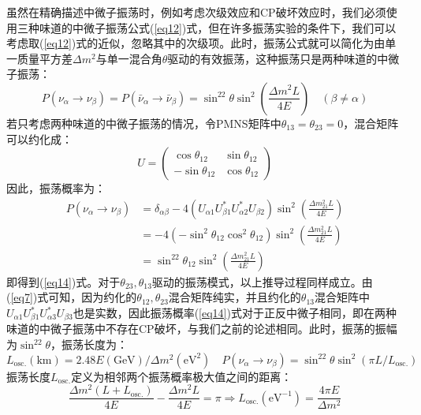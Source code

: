 \documentclass{article}
\begin{document}
		虽然在精确描述中微子振荡时，例如考虑次级效应和CP破坏效应时，我们必须使用三种味道的中微子振荡公式(\ref{eq12})式，但在许多振荡实验的条件下，我们可以考虑取(\ref{eq12})式的近似，忽略其中的次级项。此时，振荡公式就可以简化为由单一质量平方差$\Delta m^2$与单一混合角$\theta$驱动的有效振荡，这种振荡只是两种味道的中微子振荡：
		\begin{equation}
			P(\nu_\alpha\to\nu_\beta)=P(\bar{\nu}_\alpha\to\bar{\nu}_\beta)=\sin^22\theta\sin^2\left(\frac{\Delta m^2 L}{4E}\right)\quad (\beta\ne\alpha)
			\label{eq14}
		\end{equation}
		若只考虑两种味道的中微子振荡的情况，令PMNS矩阵中$\theta_{13}=\theta_{23}=0$，混合矩阵可以约化成：
		\begin{equation*}
			U=\begin{pmatrix}
				\cos\theta_{12}&\sin\theta_{12}\\
				-\sin\theta_{12}&\cos\theta_{12}
			\end{pmatrix}
		\end{equation*}
		因此，振荡概率为：
		\begin{equation*}
			\begin{aligned}
				P(\nu_\alpha\to\nu_\beta)&=\delta_{\alpha\beta}-4(U_{\alpha 1}U_{\beta 1}^\ast U_{\alpha 2}^\ast U_{\beta 2})\sin^2\left(\frac{\Delta m_{21}^2L}{4E}\right)\\
				&=-4(-\sin^2\theta_{12}\cos^2\theta_{12})\sin^2\left(\frac{\Delta m_{21}^2L}{4E}\right)\\
				&=\sin^22\theta_{12}\sin^2\left(\frac{\Delta m_{21}^2L}{4E}\right)
			\end{aligned}
		\end{equation*}
		即得到(\ref{eq14})式。对于$\theta_{23},\theta_{13}$驱动的振荡模式，以上推导过程同样成立。由(\ref{eq7})式可知，因为约化的$\theta_{12},\theta_{23}$混合矩阵纯实，并且约化的$\theta_{13}$混合矩阵中$U_{\alpha 1}U_{\beta 1}^\ast U_{\alpha 3}^\ast U_{\beta 3}$也是实数，因此振荡概率(\ref{eq14})式对于正反中微子相同，即在两种味道的中微子振荡中不存在CP破坏，与我们之前的论述相同。此时，振荡的振幅为$\sin^22\theta$，振荡长度为：
		\begin{equation}
			L_\mathrm{osc.}(\mathrm{km})=2.48E(\mathrm{GeV})/\Delta m^2(\mathrm{eV}^2)\quad P(\nu_\alpha\to\nu_\beta)=\sin^22\theta\sin^2(\pi L/L_\mathrm{osc.})
		\end{equation}
		振荡长度$L_\mathrm{osc.}$定义为相邻两个振荡概率极大值之间的距离：
		\begin{equation*}
			\frac{\Delta m^2(L+L_\mathrm{osc.})}{4E}-\frac{\Delta m^2 L}{4E}=\pi\Rightarrow L_\mathrm{osc.}(\mathrm{eV}^{-1})=\frac{4\pi E}{\Delta m^2}
		\end{equation*}
\end{document}
